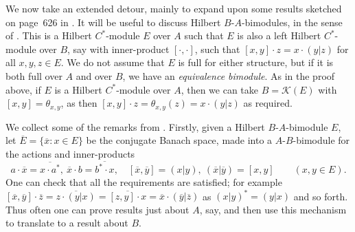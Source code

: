 \documentclass[a4paper,11pt]{article}
\theoremstyle{plain}
\theoremstyle{remark}
\newcommand{\mc}[1]{\mathcal{#1}}
\begin{document}
We now take an extended detour, mainly to expand upon some results sketched on page~626 in \cite{Schweizer_HilbModsPredual}.
It will be useful to discuss Hilbert $B$-$A$-bimodules, in the sense of \cite[Definition~1.8]{BMS_quasimults}.  This is a Hilbert $C^*$-module $E$ over $A$ such that $E$ is also a left Hilbert $C^*$-module over $B$, say with inner-product $[\cdot,\cdot]$, such that $[x,y]\cdot z = x \cdot (y|z)$ for all $x,y,z\in E$.  We do not assume that $E$ is full for either structure, but if it is both full over $A$ and over $B$, we have an \emph{equivalence bimodule}.  As in the proof above, if $E$ is a Hilbert $C^*$-module over $A$, then we can take $B = \mc K(E)$ with $[x,y] = \theta_{x,y}$, as then $[x,y]\cdot z = \theta_{x,y}(z) = x\cdot (y|z)$ as required.

We collect some of the remarks from \cite{BMS_quasimults}.  Firstly, given a Hilbert $B$-$A$-bimodule $E$, let $\overline E = \{ \overline x : x\in E \}$ be the conjugate Banach space, made into a $A$-$B$-bimodule for the actions and inner-products
\[ a \cdot \overline x = \overline{x\cdot a^*}, \ 
\overline x\cdot b = \overline{b^*\cdot x}, \quad
[\overline x, \overline y] = (x|y), \ 
(\overline x|\overline y) = [x,y] \qquad (x,y\in E). \]
One can check that all the requirements are satisfied; for example $[\overline x, \overline y] \cdot \overline z = \overline{z\cdot(y|x)} = \overline{ [z,y]\cdot x } = \overline x \cdot (\overline y|\overline z)$ as $(x|y)^* = (y|x)$ and so forth.  Thus often one can prove results just about $A$, say, and then use this mechanism to translate to a result about $B$.
\end{document}
